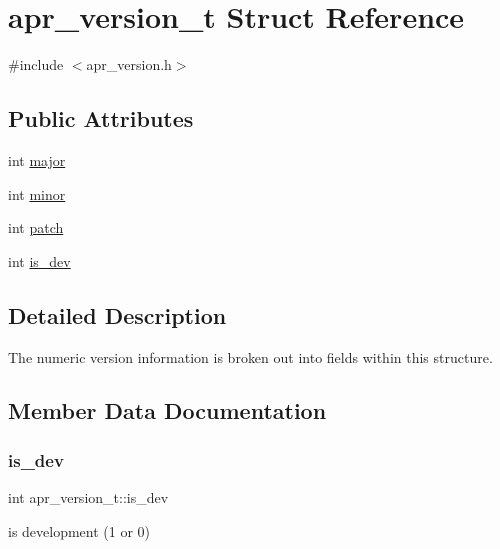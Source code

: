 \hypertarget{structapr__version__t}{}\section{apr\+\_\+version\+\_\+t Struct Reference}
\label{structapr__version__t}


{\ttfamily \#include $<$apr\+\_\+version.\+h$>$}

\subsection*{Public Attributes}
\begin{DoxyCompactItemize}
\item 
int \mbox{\hyperlink{structapr__version__t_a0ae64fee85387834ab76d9f9288373ab}{major}}
\item 
int \mbox{\hyperlink{structapr__version__t_aab0a1e8362517416389631bceeeedbad}{minor}}
\item 
int \mbox{\hyperlink{structapr__version__t_a98a629a88e776642d6e527d7535e0791}{patch}}
\item 
int \mbox{\hyperlink{structapr__version__t_aadc878af1010faa53e365e1142c81ced}{is\+\_\+dev}}
\end{DoxyCompactItemize}


\subsection{Detailed Description}
The numeric version information is broken out into fields within this structure. 

\subsection{Member Data Documentation}
\mbox{\label{structapr__version__t_aadc878af1010faa53e365e1142c81ced}} 
\subsubsection{\texorpdfstring{is\+\_\+dev}{is\_dev}}
{\footnotesize\ttfamily int apr\+\_\+version\+\_\+t\+::is\+\_\+dev}

is development (1 or 0) \mbox{\label{structapr__version__t_a0ae64fee85387834ab76d9f9288373ab}} 
